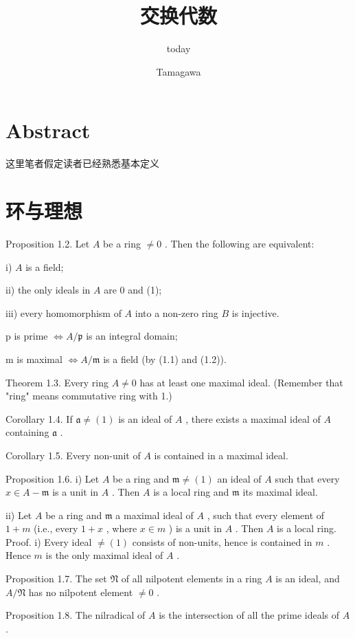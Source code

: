 \documentclass[]{article}
\title{交换代数}
\author{today}
\author{Tamagawa}
\begin{document}
	
	

\maketitle

\section{Abstract}
这里笔者假定读者已经熟悉基本定义

\section{环与理想}

Proposition 1.2. Let $A$ be a ring $\neq 0$ . Then the following are equivalent: 

i) $A$ is a field; 

ii) the only ideals in $A$ are 0 and (1); 

iii) every homomorphism of $A$ into a non-zero ring $B$ is injective. 

p is prime $\Leftrightarrow A / \mathfrak{p}$ is an integral domain; 

m is maximal $\Leftrightarrow A / \mathfrak{m}$ is a field (by (1.1) and (1.2)). 

Theorem 1.3. Every ring $A \neq 0$ has at least one maximal ideal. (Remember that "ring" means commutative ring with 1.) 

Corollary 1.4. If $\mathfrak{a} \neq (1)$ is an ideal of $A$ , there exists a maximal ideal of $A$ containing $\mathfrak{a}$ . 

Corollary 1.5. Every non-unit of $A$ is contained in a maximal ideal. 

Proposition 1.6. i) Let $A$ be a ring and $\mathfrak{m} \neq (1)$ an ideal of $A$ such that every $x \in A - \mathfrak{m}$ is a unit in $A$ . Then $A$ is a local ring and $\mathfrak{m}$ its maximal ideal.

ii) Let $A$ be a ring and $\mathfrak{m}$ a maximal ideal of $A$ , such that every element of  $1 + m$ (i.e., every $1 + x$ , where $x \in m$ ) is a unit in $A$ . Then $A$ is a local ring. Proof. i) Every ideal $\neq (1)$ consists of non-units, hence is contained in $m$ . Hence $m$ is the only maximal ideal of $A$ . 

Proposition 1.7. The set $\mathfrak{N}$ of all nilpotent elements in a ring $A$ is an ideal, and $A / \mathfrak{N}$ has no nilpotent element $\neq 0$ . 

Proposition 1.8. The nilradical of $A$ is the intersection of all the prime ideals of $A$ . 
\end{document}
